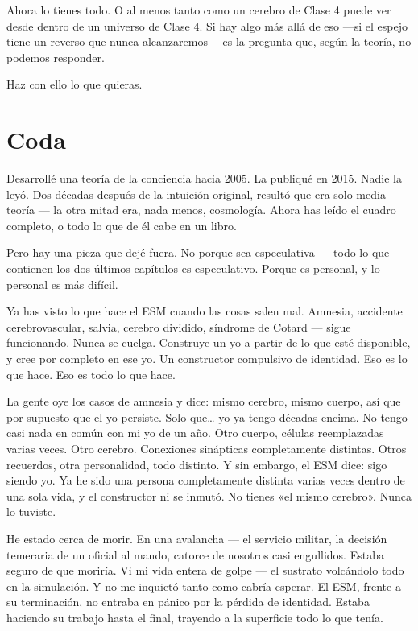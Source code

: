\documentclass[11pt, twoside, openright]{book}
\begin{document}
Ahora lo tienes todo. O al menos tanto como un cerebro de Clase 4 puede ver desde dentro de un universo de Clase 4. Si hay algo más allá de eso ---si el espejo tiene un reverso que nunca alcanzaremos--- es la pregunta que, según la teoría, no podemos responder.

Haz con ello lo que quieras.


\chapter*{Coda}

Desarrollé una teoría de la conciencia hacia 2005. La publiqué en 2015. Nadie la leyó. Dos décadas después de la intuición original, resultó que era solo media teoría --- la otra mitad era, nada menos, cosmología. Ahora has leído el cuadro completo, o todo lo que de él cabe en un libro.

Pero hay una pieza que dejé fuera. No porque sea especulativa --- todo lo que contienen los dos últimos capítulos es especulativo. Porque es personal, y lo personal es más difícil.

Ya has visto lo que hace el ESM cuando las cosas salen mal. Amnesia, accidente cerebrovascular, salvia, cerebro dividido, síndrome de Cotard --- sigue funcionando. Nunca se cuelga. Construye un yo a partir de lo que esté disponible, y cree por completo en ese yo. Un constructor compulsivo de identidad. Eso es lo que hace. Eso es todo lo que hace.

La gente oye los casos de amnesia y dice: mismo cerebro, mismo cuerpo, así que por supuesto que el yo persiste. Solo que\ldots{} yo ya tengo décadas encima. No tengo casi nada en común con mi yo de un año. Otro cuerpo, células reemplazadas varias veces. Otro cerebro. Conexiones sinápticas completamente distintas. Otros recuerdos, otra personalidad, todo distinto. Y sin embargo, el ESM dice: sigo siendo yo. Ya he sido una persona completamente distinta varias veces dentro de una sola vida, y el constructor ni se inmutó. No tienes «el mismo cerebro». Nunca lo tuviste.

He estado cerca de morir. En una avalancha --- el servicio militar, la decisión temeraria de un oficial al mando, catorce de nosotros casi engullidos. Estaba seguro de que moriría. Vi mi vida entera de golpe --- el sustrato volcándolo todo en la simulación. Y no me inquietó tanto como cabría esperar. El ESM, frente a su terminación, no entraba en pánico por la pérdida de identidad. Estaba haciendo su trabajo hasta el final, trayendo a la superficie todo lo que tenía.
\end{document}
